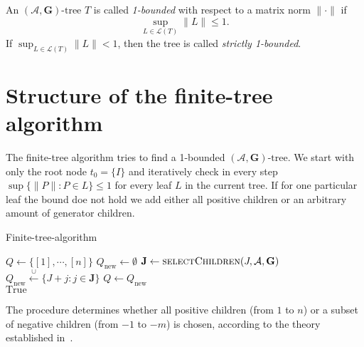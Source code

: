\begin{definition}
An $(\mathcal{A},\mathbf{G})\text{-tree}$ $T$ is called \emph{1-bounded} with respect to a matrix norm \( \| \cdot \| \) if
\[
    \sup_{L \in \mathcal{L}(T)} \| L \| \leq 1.
\]
If \( \sup_{L \in \mathcal{L}(T)} \| L \| < 1 \), then the tree is called \emph{strictly 1-bounded}.
\end{definition}

\section{Structure of the finite-tree algorithm}
The finite-tree algorithm tries to find a 1-bounded $(\mathcal{A},\mathbf{G})\text{-tree}$. We start with only the root node $t_0 = \{I\}$ and iteratively check in every step $ \sup \{\lVert P \rVert: P \in L\} \le 1$ for every leaf $L$ in the current tree. If for one particular leaf the bound doe not hold we add either all positive children or an arbitrary amount of generator children.

\begin{algorithm}[h]
    \caption{Finite-tree-algorithm}
    \label{alg:tree}
    \begin{algorithmic}
        \State {}
        \State {}
        \State $Q \leftarrow \{[1], \cdots, [n]\}$
            \State $Q_{\text{new}} \leftarrow \emptyset$
                    \State $\textbf{J} \leftarrow \textproc{selectChildren}(J, \mathcal{A}, \textbf{G})$ %
                    \State $Q_{\text{new}} \xleftarrow{\cup} \{J + j: j \in \textbf{J}\}$
                \EndIf
            \EndFor
            \State $Q \leftarrow Q_{\text{new}}$
        \EndWhile \\
        \Return $\text{True}$
    \end{algorithmic}
\end{algorithm}

\begin{remark}\label{rem:moller}
The procedure  determines whether all positive children (from $1$ to $n$) or a subset of negative children (from $-1$ to $-m$) is chosen, according to the theory established in~\citep{mollerTreebasedApproachJoint2014}.
\end{remark}

